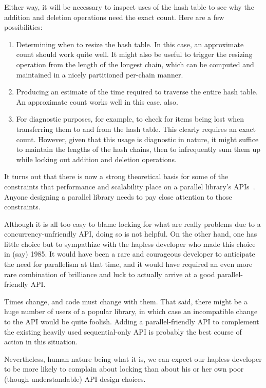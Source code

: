 Either way, it will be necessary to inspect uses of the hash table to see
why the addition and deletion operations need the exact count.
Here are a few possibilities:

\begin{enumerate}
\item	Determining when to resize the hash table.
	In this case, an approximate count should work quite well.
	It might also be useful to trigger the resizing operation from
	the length of the longest chain, which can be computed and
	maintained in a nicely partitioned per-chain manner.
\item	Producing an estimate of the time required to traverse the
	entire hash table.
	An approximate count works well in this case, also.
\item	For diagnostic purposes, for example, to check for items being
	lost when transferring them to and from the hash table.
	This clearly requires an exact count.
	However, given that this usage is diagnostic in nature, it might
	suffice to maintain the lengths of the hash chains, then to
	infrequently sum them
	up while locking out addition and deletion operations.
\end{enumerate}

It turns out that there is now a strong theoretical basis for some of the
constraints that performance and scalability place on a parallel library's
APIs~\cite{HagitAttiya2011LawsOfOrder,Attiya:2011:LOE:1925844.1926442,PaulEMcKenney2011SNC}.
Anyone designing a parallel library needs to pay close attention to
those constraints.

Although it is all too easy to blame locking for what are really problems
due to a concurrency-unfriendly API, doing so is not helpful.
On the other hand, one has little choice but to sympathize with the
hapless developer who made this choice in (say) 1985.
It would have been a rare and courageous developer to anticipate the
need for parallelism at that time, and it would have required an
even more rare combination of brilliance and luck to actually arrive
at a good parallel-friendly API.

Times change, and code must change with them.
That said, there might be a huge number of users of a popular library,
in which case an incompatible change to the API would be quite foolish.
Adding a parallel-friendly API to complement the existing heavily used
sequential-only API is probably the best course of action in this
situation.

Nevertheless, human nature being what it is, we can expect our hapless
developer to be more likely to complain about locking than about his
or her own poor (though understandable) API design choices.

